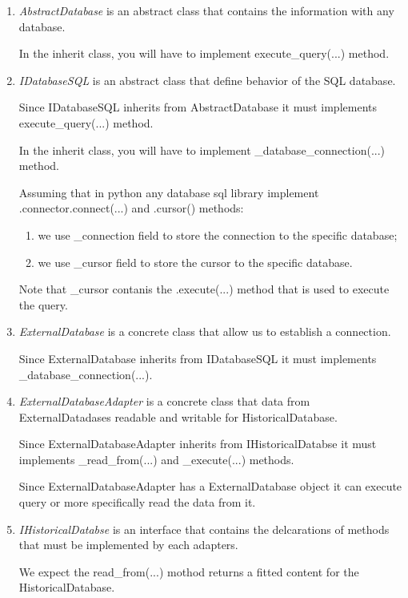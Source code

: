 \begin{enumerate}
	\item \textit{AbstractDatabase} is an abstract class that contains the information with any database.
     
     In the inherit class, you will have to implement execute\_query(...) method.

	\item \textit{IDatabaseSQL} is an abstract class that define behavior of the SQL database.
     
     Since IDatabaseSQL inherits from AbstractDatabase it must implements execute\_query(...) method.
     
     In the inherit class, you will have to implement \_database\_connection(...) method.

     Assuming that in python any database sql library implement .connector.connect(...) and .cursor() methods: 
\begin{enumerate}
	\item we use \_connection field to store the connection to the specific database;
	\item we use \_cursor field to store the cursor to the specific database.
\end{enumerate}

Note that \_cursor contanis the .execute(...) method that is used to execute the query.

	\item \textit{ExternalDatabase} is a concrete class that allow us to establish a connection.
	
     Since ExternalDatabase inherits from IDatabaseSQL it must implements \_database\_connection(...).

	\item \textit{ExternalDatabaseAdapter} is a concrete class that data from ExternalDatadases readable and writable for HistoricalDatabase. 
	
     Since ExternalDatabaseAdapter inherits from IHistoricalDatabse it must implements \_read\_from(...) and \_execute(...) methods.
     
     Since ExternalDatabaseAdapter has a ExternalDatabase object it can execute query or more specifically read the data from it.

	\item \textit{IHistoricalDatabse} is an interface that contains the delcarations of methods that must be implemented by each adapters.
	
     We expect the read\_from(...) mothod returns a fitted content for the HistoricalDatabase. 


\end{enumerate}
